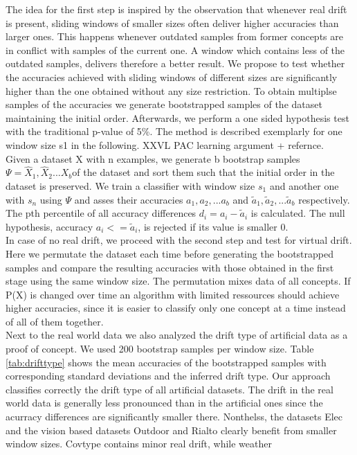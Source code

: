 \documentclass[conference]{IEEEtran}
\begin{document}
The idea for the first step is inspired by the observation that whenever real drift is present, sliding windows of smaller sizes often deliver higher accuracies than larger ones. This happens
whenever outdated samples from former concepts are in conflict with samples of the current one. A window which contains less of the outdated samples, delivers therefore a better result. 
We propose to test whether the accuracies achieved with sliding windows of different sizes are significantly higher than the one obtained without any size restriction. 
To obtain multiplse samples of the accuracies we generate bootstrapped samples of the dataset maintaining the initial order. Afterwards, we perform a one sided hypothesis test with the traditional p-value of 5\%.
The method is described exemplarly for one window size s1 in the following. XXVL PAC learning argument + refernce.\\
Given a dataset X with n examples, we generate b bootstrap samples $\Psi=\hat{X}_1,\hat{X}_2...{X}_b$of the dataset and sort them such that the initial order in the dataset is preserved. 
We train a classifier with window size $s_1$ and another one with $s_n$ using $\Psi$ and asses their accuracies $a_1,a_2,...a_b$ and $\tilde{a}_1,\tilde{a}_2,...\tilde{a}_b$ respectively.  
The pth percentile of all accuracy differences $d_i = a_i - \tilde{a}_i$ is calculated. The null hypothesis, accuracy $a_i <= \tilde{a}_i$, is rejected if its value is smaller 0.\\
In case of no real drift, we proceed with the second step and test for virtual drift. Here we permutate the dataset each time before generating the bootstrapped samples and compare
the resulting accuracies with those obtained in the first stage using the same window size. The permutation mixes data of all concepts. If P(X) is changed over time an 
algorithm with limited ressources should achieve higher accuracies, since it is easier to classify only one concept at a time instead of all of them together.\\
Next to the real world data we also analyzed the drift type of artificial data as a proof of concept. We used 200 bootstrap samples per window size.
Table \ref{tab:drifttype} shows the mean accuracies of the bootstrapped samples with corresponding standard deviations and the inferred drift type. Our approach classifies correctly
the drift type of all artificial datasets. The drift in the real world data is generally less pronounced than in the artificial ones since the acurracy differences are significantly
smaller there. Nonthelss, the datasets Elec and the vision based datasets Outdoor and Rialto clearly benefit from smaller window sizes. Covtype contains minor real drift, while weather
\end{document}
